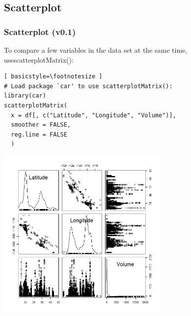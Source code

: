 \subsection{Scatterplot}
\begin{frame}
\frametitle{Scatterplot (v0.1)}

To compare a few variables in the data set at the same time, use\ttfamily scatterplotMatrix(): \normalfont
  		\begin{lstlisting}[ basicstyle=\footnotesize ]
# Load package `car' to use scatterplotMatrix():	
library(car)	
scatterplotMatrix(
  x = df[, c("Latitude", "Longitude", "Volume")], 
  smoother = FALSE, 
  reg.line = FALSE
  )
		\end{lstlisting}

        \begin{center}
         \includegraphics[width=0.63\textwidth]{images/scatterPlot_v0.png}
        \end{center}
\end{frame}


